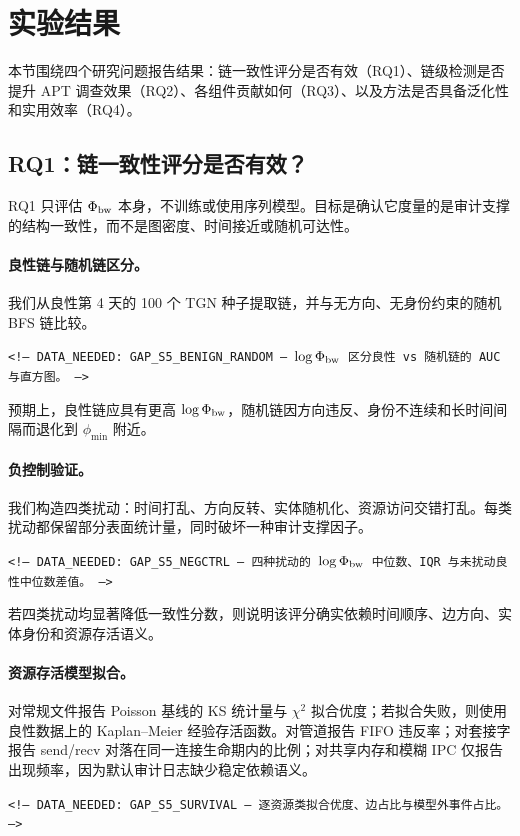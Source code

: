 \section{实验结果}
\label{sec:evaluation}

本节围绕四个研究问题报告结果：链一致性评分是否有效（RQ1）、链级检测是否提升 APT 调查效果（RQ2）、各组件贡献如何（RQ3）、以及方法是否具备泛化性和实用效率（RQ4）。

\subsection{RQ1：链一致性评分是否有效？}
\label{sec:metric}

RQ1 只评估 $\Phi_{\text{bw}}$ 本身，不训练或使用序列模型。目标是确认它度量的是审计支撑的结构一致性，而不是图密度、时间接近或随机可达性。

\paragraph{良性链与随机链区分。}我们从良性第 4 天的 100 个 TGN 种子提取链，并与无方向、无身份约束的随机 BFS 链比较。
\begin{flushleft}\small\texttt{<!-- DATA\_NEEDED: GAP\_S5\_BENIGN\_RANDOM --- $\log\Phi_{\text{bw}}$ 区分良性 vs 随机链的 AUC 与直方图。 -->}\end{flushleft}
预期上，良性链应具有更高 $\log\Phi_{\text{bw}}$，随机链因方向违反、身份不连续和长时间间隔而退化到 $\phi_{\min}$ 附近。

\paragraph{负控制验证。}我们构造四类扰动：时间打乱、方向反转、实体随机化、资源访问交错打乱。每类扰动都保留部分表面统计量，同时破坏一种审计支撑因子。
\begin{flushleft}\small\texttt{<!-- DATA\_NEEDED: GAP\_S5\_NEGCTRL --- 四种扰动的 $\log\Phi_{\text{bw}}$ 中位数、IQR 与未扰动良性中位数差值。 -->}\end{flushleft}
若四类扰动均显著降低一致性分数，则说明该评分确实依赖时间顺序、边方向、实体身份和资源存活语义。

\paragraph{资源存活模型拟合。}对常规文件报告 Poisson 基线的 KS 统计量与 $\chi^2$ 拟合优度；若拟合失败，则使用良性数据上的 Kaplan--Meier 经验存活函数。对管道报告 FIFO 违反率；对套接字报告 send/recv 对落在同一连接生命期内的比例；对共享内存和模糊 IPC 仅报告出现频率，因为默认审计日志缺少稳定依赖语义。
\begin{flushleft}\small\texttt{<!-- DATA\_NEEDED: GAP\_S5\_SURVIVAL --- 逐资源类拟合优度、边占比与模型外事件占比。 -->}\end{flushleft}

